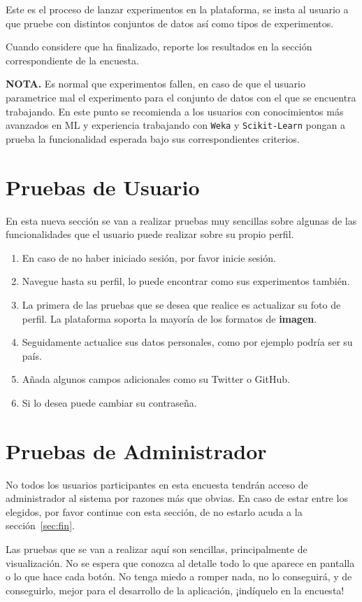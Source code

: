 \documentclass[
	12pt,
	spanish
]{article}
\begin{document}
Este es el proceso de lanzar experimentos en la plataforma, se insta al usuario a que pruebe con distintos conjuntos de datos así como tipos de experimentos. 

Cuando considere que ha finalizado, reporte los resultados en la sección correspondiente de la encuesta.
\vfill


\textbf{NOTA.} Es normal que experimentos fallen, en caso de que el usuario parametrice mal el experimento para el conjunto de datos con el que se encuentra trabajando. En este punto se recomienda a los usuarios con conocimientos más avanzados en ML y experiencia trabajando con \texttt{Weka} y \texttt{Scikit-Learn} pongan a prueba la funcionalidad esperada bajo sus correspondientes criterios.
\pagebreak

\section{Pruebas de Usuario}
En esta nueva sección se van a realizar pruebas muy sencillas sobre algunas de las funcionalidades que el usuario puede realizar sobre su propio perfil.

\begin{enumerate}
\item En caso de no haber iniciado sesión, por favor inicie sesión.
\item Navegue hasta su perfil, lo puede encontrar como sus experimentos también.
\item La primera de las pruebas que se desea que realice es actualizar su foto de perfil. La plataforma soporta la mayoría de los formatos de \textbf{imagen}.
\item Seguidamente actualice sus datos personales, como por ejemplo podría ser su país.
\item Añada algunos campos adicionales como su Twitter o GitHub.
\item Si lo desea puede cambiar su contraseña.
\end{enumerate} 

\pagebreak
\section{Pruebas de Administrador}
No todos los usuarios participantes en esta encuesta tendrán acceso de administrador al sistema por razones más que obvias. En caso de estar entre los elegidos, por favor continue con esta sección, de no estarlo acuda a la sección~\ref{sec:fin}.

Las pruebas que se van a realizar aquí son sencillas, principalmente de visualización. No se espera que conozca al detalle todo lo que aparece en pantalla o lo que hace cada botón. No tenga miedo a romper nada, no lo conseguirá, y de conseguirlo, mejor para el desarrollo de la aplicación, ¡indíquelo en la encuesta!
\end{document}
